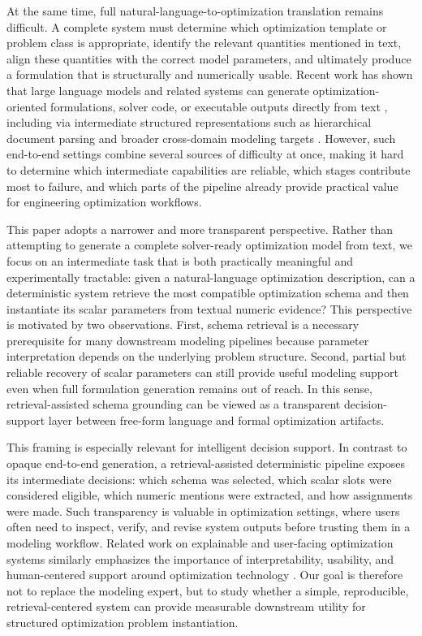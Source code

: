 \documentclass[pdflatex,sn-basic,Numbered]{sn-jnl}
\begin{document}
At the same time, full natural-language-to-optimization translation remains difficult. A complete system must determine which optimization template or problem class is appropriate, identify the relevant quantities mentioned in text, align these quantities with the correct model parameters, and ultimately produce a formulation that is structurally and numerically usable. Recent work has shown that large language models and related systems can generate optimization-oriented formulations, solver code, or executable outputs directly from text \cite{ahmaditeshnizi2024optimus_icml,zhang2024optllm,ahmed2025opt2code}, including via intermediate structured representations such as hierarchical document parsing \cite{ramamonjison2023latex2solver} and broader cross-domain modeling targets \cite{singirikonda2025text2zinc}. However, such end-to-end settings combine several sources of difficulty at once, making it hard to determine which intermediate capabilities are reliable, which stages contribute most to failure, and which parts of the pipeline already provide practical value for engineering optimization workflows.

This paper adopts a narrower and more transparent perspective. Rather than attempting to generate a complete solver-ready optimization model from text, we focus on an intermediate task that is both practically meaningful and experimentally tractable: given a natural-language optimization description, can a deterministic system retrieve the most compatible optimization schema and then instantiate its scalar parameters from textual numeric evidence? This perspective is motivated by two observations. First, schema retrieval is a necessary prerequisite for many downstream modeling pipelines because parameter interpretation depends on the underlying problem structure. Second, partial but reliable recovery of scalar parameters can still provide useful modeling support even when full formulation generation remains out of reach. In this sense, retrieval-assisted schema grounding can be viewed as a transparent decision-support layer between free-form language and formal optimization artifacts.

This framing is especially relevant for intelligent decision support. In contrast to opaque end-to-end generation, a retrieval-assisted deterministic pipeline exposes its intermediate decisions: which schema was selected, which scalar slots were considered eligible, which numeric mentions were extracted, and how assignments were made. Such transparency is valuable in optimization settings, where users often need to inspect, verify, and revise system outputs before trusting them in a modeling workflow. Related work on explainable and user-facing optimization systems similarly emphasizes the importance of interpretability, usability, and human-centered support around optimization technology \cite{biemans2025explainableoptimization,powell2025scheduling_explanations}. Our goal is therefore not to replace the modeling expert, but to study whether a simple, reproducible, retrieval-centered system can provide measurable downstream utility for structured optimization problem instantiation.
\end{document}
